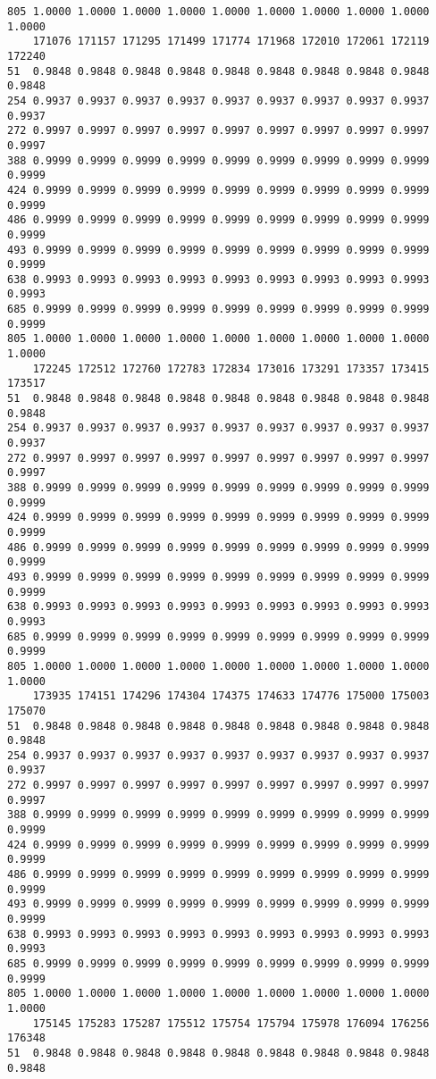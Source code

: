 \documentclass[
]{report}
\begin{document}
\begin{verbatim}
805 1.0000 1.0000 1.0000 1.0000 1.0000 1.0000 1.0000 1.0000 1.0000 1.0000
    171076 171157 171295 171499 171774 171968 172010 172061 172119 172240
51  0.9848 0.9848 0.9848 0.9848 0.9848 0.9848 0.9848 0.9848 0.9848 0.9848
254 0.9937 0.9937 0.9937 0.9937 0.9937 0.9937 0.9937 0.9937 0.9937 0.9937
272 0.9997 0.9997 0.9997 0.9997 0.9997 0.9997 0.9997 0.9997 0.9997 0.9997
388 0.9999 0.9999 0.9999 0.9999 0.9999 0.9999 0.9999 0.9999 0.9999 0.9999
424 0.9999 0.9999 0.9999 0.9999 0.9999 0.9999 0.9999 0.9999 0.9999 0.9999
486 0.9999 0.9999 0.9999 0.9999 0.9999 0.9999 0.9999 0.9999 0.9999 0.9999
493 0.9999 0.9999 0.9999 0.9999 0.9999 0.9999 0.9999 0.9999 0.9999 0.9999
638 0.9993 0.9993 0.9993 0.9993 0.9993 0.9993 0.9993 0.9993 0.9993 0.9993
685 0.9999 0.9999 0.9999 0.9999 0.9999 0.9999 0.9999 0.9999 0.9999 0.9999
805 1.0000 1.0000 1.0000 1.0000 1.0000 1.0000 1.0000 1.0000 1.0000 1.0000
    172245 172512 172760 172783 172834 173016 173291 173357 173415 173517
51  0.9848 0.9848 0.9848 0.9848 0.9848 0.9848 0.9848 0.9848 0.9848 0.9848
254 0.9937 0.9937 0.9937 0.9937 0.9937 0.9937 0.9937 0.9937 0.9937 0.9937
272 0.9997 0.9997 0.9997 0.9997 0.9997 0.9997 0.9997 0.9997 0.9997 0.9997
388 0.9999 0.9999 0.9999 0.9999 0.9999 0.9999 0.9999 0.9999 0.9999 0.9999
424 0.9999 0.9999 0.9999 0.9999 0.9999 0.9999 0.9999 0.9999 0.9999 0.9999
486 0.9999 0.9999 0.9999 0.9999 0.9999 0.9999 0.9999 0.9999 0.9999 0.9999
493 0.9999 0.9999 0.9999 0.9999 0.9999 0.9999 0.9999 0.9999 0.9999 0.9999
638 0.9993 0.9993 0.9993 0.9993 0.9993 0.9993 0.9993 0.9993 0.9993 0.9993
685 0.9999 0.9999 0.9999 0.9999 0.9999 0.9999 0.9999 0.9999 0.9999 0.9999
805 1.0000 1.0000 1.0000 1.0000 1.0000 1.0000 1.0000 1.0000 1.0000 1.0000
    173935 174151 174296 174304 174375 174633 174776 175000 175003 175070
51  0.9848 0.9848 0.9848 0.9848 0.9848 0.9848 0.9848 0.9848 0.9848 0.9848
254 0.9937 0.9937 0.9937 0.9937 0.9937 0.9937 0.9937 0.9937 0.9937 0.9937
272 0.9997 0.9997 0.9997 0.9997 0.9997 0.9997 0.9997 0.9997 0.9997 0.9997
388 0.9999 0.9999 0.9999 0.9999 0.9999 0.9999 0.9999 0.9999 0.9999 0.9999
424 0.9999 0.9999 0.9999 0.9999 0.9999 0.9999 0.9999 0.9999 0.9999 0.9999
486 0.9999 0.9999 0.9999 0.9999 0.9999 0.9999 0.9999 0.9999 0.9999 0.9999
493 0.9999 0.9999 0.9999 0.9999 0.9999 0.9999 0.9999 0.9999 0.9999 0.9999
638 0.9993 0.9993 0.9993 0.9993 0.9993 0.9993 0.9993 0.9993 0.9993 0.9993
685 0.9999 0.9999 0.9999 0.9999 0.9999 0.9999 0.9999 0.9999 0.9999 0.9999
805 1.0000 1.0000 1.0000 1.0000 1.0000 1.0000 1.0000 1.0000 1.0000 1.0000
    175145 175283 175287 175512 175754 175794 175978 176094 176256 176348
51  0.9848 0.9848 0.9848 0.9848 0.9848 0.9848 0.9848 0.9848 0.9848 0.9848

\end{verbatim}
\end{document}
